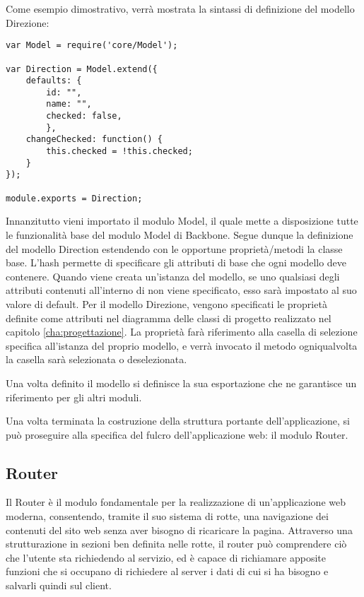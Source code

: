 Come esempio dimostrativo, verrà mostrata la sintassi di definizione del modello Direzione:

\begin{lstlisting}
var Model = require('core/Model');

var Direction = Model.extend({
    defaults: {
        id: "",
        name: "",
        checked: false,
        },
    changeChecked: function() {
        this.checked = !this.checked;
    }
});

module.exports = Direction;
\end{lstlisting}

Innanzitutto vieni importato il modulo Model, il quale mette a disposizione tutte le funzionalità base del modulo Model di Backbone.
Segue dunque la definizione del modello Direction estendendo con le opportune proprietà/metodi la classe base.
L'hash  permette di specificare gli attributi di base che ogni modello deve contenere. Quando viene creata un'istanza del modello, se uno qualsiasi degli attributi contenuti all'interno di  non viene specificato, esso sarà impostato al suo valore di default.
Per il modello Direzione, vengono specificati le proprietà definite come attributi nel diagramma delle classi di progetto realizzato nel capitolo \ref{cha:progettazione}. La proprietà  farà riferimento alla casella di selezione specifica all'istanza del proprio modello, e verrà invocato il metodo  ogniqualvolta la casella sarà selezionata o deselezionata.

Una volta definito il modello si definisce la sua esportazione che ne garantisce un riferimento per gli altri moduli.

Una volta terminata la costruzione della struttura portante dell'applicazione, si può proseguire alla specifica del fulcro dell'applicazione web: il modulo Router.
\newpage

\subsection{Router} %
\label{sub:router}

Il Router è il modulo fondamentale per la realizzazione di un'applicazione web moderna, consentendo, tramite il suo sistema di rotte, una navigazione dei contenuti del sito web senza aver bisogno di ricaricare la pagina.
Attraverso una strutturazione in sezioni ben definita nelle rotte, il router può comprendere ciò che l'utente sta richiedendo al servizio, ed è capace di richiamare apposite funzioni che si occupano di richiedere al server i dati di cui si ha bisogno e salvarli quindi sul client.

